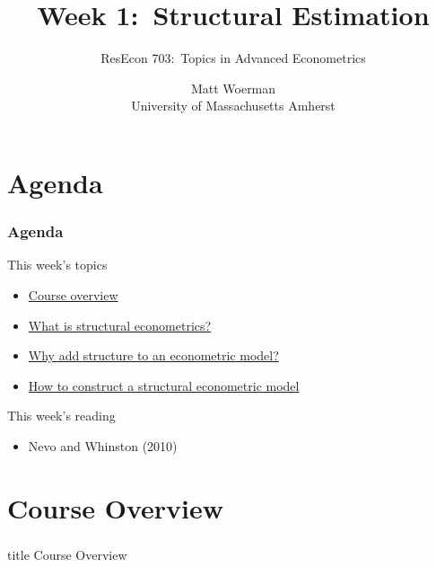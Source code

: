 \documentclass{beamer}
\title[Week 1:\ Structural Estimation]{Week 1:\ Structural Estimation}
\author[ResEcon 703:\ Advanced Econometrics]{ResEcon 703:\ Topics in Advanced Econometrics}
\date{Matt Woerman\\University of Massachusetts Amherst}
\begin{document}
{ 
\begin{frame}[noframenumbering]
    \titlepage
\end{frame}
}

\section{Agenda}
\begin{frame}\frametitle{Agenda}
    This week's topics
    \begin{itemize}
    	\item \hyperlink{page.\getpagerefnumber{overview}}{Course overview}
        \item \hyperlink{page.\getpagerefnumber{what}}{What is structural econometrics?}
        \item \hyperlink{page.\getpagerefnumber{why}}{Why add structure to an econometric model?}
        \item \hyperlink{page.\getpagerefnumber{how}}{How to construct a structural econometric model}
    \end{itemize}
    \vspace{2ex}
    This week's reading
    \begin{itemize}
        \item Nevo and Whinston (2010)
    \end{itemize}
\end{frame}

\section{Course Overview}
\label{overview}
\begin{frame}\frametitle{}
    \vfill
    \centering
    \begin{beamercolorbox}[center]{title}
        \Large Course Overview
    \end{beamercolorbox}
    \vfill
\end{frame}
\end{document}
